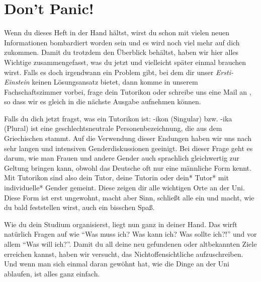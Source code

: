 %
%

\chapter{Don't Panic!}

Wenn du dieses Heft in der Hand hältst, wirst du schon mit vielen neuen Informationen bombardiert worden sein und es wird noch viel mehr auf dich zukommen. Damit du trotzdem den Überblick behältst, haben wir hier alles Wichtige zusammengefasst, was du jetzt und vielleicht später einmal brauchen wirst. Falls es doch irgendwann ein Problem gibt, bei dem dir unser \emph{Ersti-Einstein} keinen Lösungsansatz bietet, dann komme in unserem Fachschaftszimmer vorbei, frage dein Tutorikon oder schreibe uns eine Mail an , so dass wir es gleich in die nächste Ausgabe aufnehmen können. 

Falls du dich jetzt fragst, was ein Tutorikon ist: -ikon (Singular) bzw. -ika (Plural) ist eine geschlechtsneutrale Personenbezeichnung, die aus dem Griechischen stammt. Auf die Verwendung dieser Endungen haben wir uns nach sehr langen und intensiven Genderdiskussionen geeinigt. Bei dieser Frage geht es darum, wie man Frauen und andere Gender auch sprachlich gleichwertig zur Geltung bringen kann, obwohl das Deutsche oft nur eine männliche Form kennt. Mit Tutorikon sind also dein Tutor, deine Tutorin oder dein* Tutor* mit individuelle* Gender gemeint. Diese zeigen dir alle wichtigen Orte an der Uni. Diese Form ist erst ungewohnt, macht aber Sinn, schließt alle ein und macht, wie du bald feststellen wirst, auch ein bisschen Spaß.

Wie du dein Studium organisierst, liegt nun ganz in deiner Hand. Das wirft natürlich Fragen auf wie ``Was muss ich? Was kann ich? Was sollte ich?!'' und vor allem ``Was will ich?''. Damit du all deine neu gefundenen oder altbekannten Ziele erreichen kannst, haben wir versucht, das Nichtoffensichtliche aufzuschreiben. Und wenn man sich einmal daran gewöhnt hat, wie die Dinge an der Uni ablaufen, ist alles ganz einfach.

